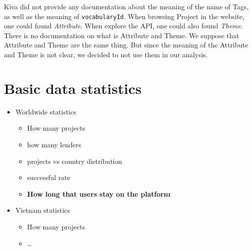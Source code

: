 Kiva did not provide any documentation about the meaning of the name of Tags,
as well as the meaning of \lstinline|vocabularyId|.
When browsing Project in the website, one could found \textit{Attribute}.
When explore the API, one could also found \textit{Theme}.
There is no documentation on what is Attribute and Theme.
We suppose that Attribute and Theme are the same thing.
But since the meaning of the Attribute and Theme is not clear,
we decided to not use them in our analysis.

\section{Basic data statistics}

\begin{itemize}
	\item Worldwide statistics
	      \begin{itemize}
		      \item How many projects
		      \item how many lenders
		      \item projects vs country distribution
		      \item successful rate
		      \item \textbf{How long that users stay on the platform}
	      \end{itemize}
	\item Vietnam statistics
	      \begin{itemize}
		      \item How many projects
		      \item \dots
	      \end{itemize}
\end{itemize}